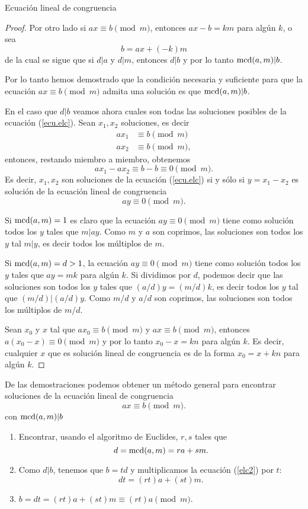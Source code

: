 \begin{section}{Ecuación lineal de congruencia}
\begin{proof}
Por otro lado si $ax\equiv b\pmod{m}$, entonces $ax-b=km$ para
algún $k$, o sea
$$
b=ax+(-k)m
$$
de la cual se sigue que si $d|a$ y $d|m$, entonces $d|b$ y por lo
tanto $\operatorname{mcd}(a,m)|b$.

Por lo tanto hemos demostrado que la condición necesaria y
suficiente para que la ecuación $ax\equiv b \pmod{m}$ admita una
solución es que $\operatorname{mcd}(a,m)|b$.

En el caso que $d|b$ veamos ahora cuales son todas las soluciones posibles de la ecuación (\ref{ecu.elc}). Sean $x_1,x_2$ soluciones, es decir
\begin{align*}
ax_1 &\equiv b \pmod{m} \\
ax_2 &\equiv b \pmod{m},
\end{align*}
entonces, restando miembro a miembro, obtenemos
$$
ax_1 -ax_2 \equiv b - b \equiv 0 \pmod{m}.
$$
Es decir, $x_1,x_2$ son soluciones de la ecuación (\ref{ecu.elc}) si y sólo si  $y = x_1 -x_2$ es solución de la ecuación lineal de congruencia
\begin{equation*}
ay \equiv 0 \pmod{m}.
\end{equation*}

Si $\operatorname{mcd}(a,m) =1$ es claro que la ecuación $ay \equiv 0 \pmod{m}$ tiene como solución todos los $y$ tales que $m|ay$. Como $m$ y $a$ son  coprimos, las soluciones son todos los $y$ tal $m|y$, es decir todos los múltiplos de $m$.

Si $\operatorname{mcd}(a,m) =d > 1$,  la ecuación $ay \equiv 0 \pmod{m}$ tiene como solución todos los $y$ tales que $ay=mk$ para algún $k$. Si dividimos por $d$, podemos decir que las soluciones son todos los $y$ tales que $(a/d)y = (m/d)k$, es decir todos los $y$ tal que $(m/d)|(a/d)y$. Como $m/d$ y $a/d$ son coprimos, las soluciones son todos los múltiplos de $m/d$.

Sean $x_0$ y $x$ tal que $ax_0 \equiv b \pmod{m}$ y $ax \equiv b \pmod{m}$, entonces $a(x_0-x) \equiv 0 \pmod{m}$ y por lo tanto $x_0-x = kn$ para algún $k$. Es decir, cualquier $x$ que es solución lineal de congruencia es de la forma $x_0 = x+kn$ para algún $k$.
\end{proof}

De las demostraciones podemos obtener un método general para encontrar soluciones de la ecuación lineal de congruencia
$$
ax \equiv b \pmod{m}.
$$
con $\operatorname{mcd}(a,m)|b$


\begin{enumerate}[label=\textit{\alph*)}]
\item  Encontrar, usando el algoritmo de Euclides, $r,s$ tales que 
\begin{equation}\label{elc2}
d =\operatorname{mcd}(a,m) = ra+sm.
\end{equation}
\item  Como $d|b$, tenemos que $b = td$ y multiplicamos la ecuación (\ref{elc2}) por $t$: $$dt =  (rt)a+(st)m.$$
\item  $b = dt = (rt)a+(st)m \equiv (rt)a \pmod{m}$. 


\end{enumerate}
\end{section}

